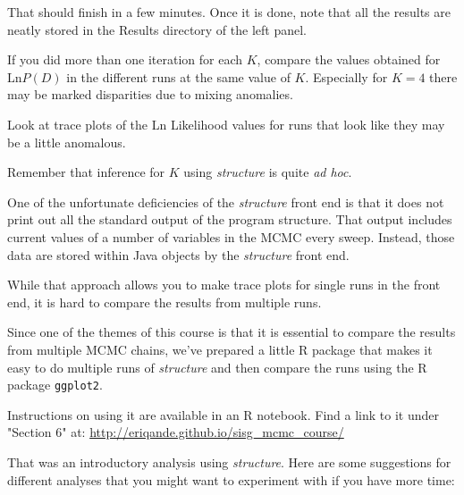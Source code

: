 That should finish in a few minutes.  Once it is done, note that all the results are neatly stored in the Results directory of the left panel.  

If you did more than one iteration for each $K$, compare the values obtained for $\mathrm{Ln} P(D)$ in the different runs at the same value of $K$.  Especially for $K=4$ there may be marked disparities due to mixing anomalies.  

Look at trace plots of the Ln Likelihood values for runs that look like they may be a little anomalous.

Remember that inference for $K$ using {\em structure} is quite {\em ad hoc}. 

One of the unfortunate deficiencies of the {\em structure} front end is that it does not
print out all the standard output of the program structure.  That output includes current
values of a number of variables in the MCMC every sweep.  Instead, those data are stored
within Java objects by the {\em structure} front end.  

While that approach allows you to make trace plots for single runs in the front end, it is hard to compare the results from multiple runs.

Since one of the themes of this course is that it is essential to compare the results from
multiple MCMC chains, we've prepared a little R package that makes it easy to do multiple
runs of {\em structure} and then compare the runs using the R package {\tt ggplot2}.

\enlargethispage*{1000pt}
Instructions on using it are available in an R notebook.  Find a link to it
under "Section 6" at:
\url{http://eriqande.github.io/sisg_mcmc_course/}

That was an introductory analysis using {\em structure}.  Here are some suggestions for different analyses that you might want to experiment with if you have more time:

